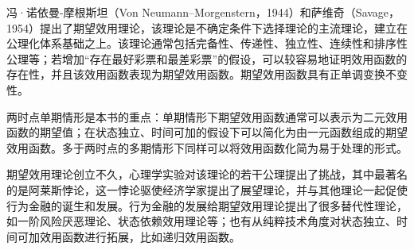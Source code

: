 

\begin{tcolorbox}[summary,title=本章小结]
冯·诺依曼-摩根斯坦（Von Neumann--Morgenstern，1944）和萨维奇（Savage，1954）提出了期望效用理论，该理论是不确定条件下选择理论的主流理论，建立在公理化体系基础之上。该理论通常包括完备性、传递性、独立性、连续性和排序性公理等；若增加“存在最好彩票和最差彩票”的假设，可以较容易地证明效用函数的存在性，并且该效用函数表现为期望效用函数。期望效用函数具有正单调变换不变性。

两时点单期情形是本书的重点：单期情形下期望效用函数通常可以表示为二元效用函数的期望值；在状态独立、时间可加的假设下可以简化为由一元函数组成的期望效用函数。多于两时点的多期情形下同样可以将效用函数化简为易于处理的形式。

期望效用理论创立不久，心理学实验对该理论的若干公理提出了挑战，其中最著名的是阿莱斯悖论，这一悖论驱使经济学家提出了展望理论，并与其他理论一起促使行为金融的诞生和发展。行为金融的发展给期望效用理论提出了很多替代性理论，如一阶风险厌恶理论、状态依赖效用理论等；也有从纯粹技术角度对状态独立、时间可加效用函数进行拓展，比如递归效用函数。
\end{tcolorbox}



